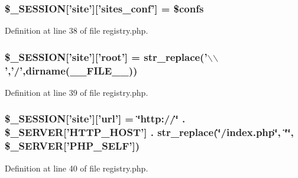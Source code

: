 \hypertarget{registry_8php_a1861ce240ebe27ceb04f3ec0575fe52f}{
\subsubsection[{\$\-\_\-\-S\-E\-S\-S\-I\-O\-N}]{\setlength{\rightskip}{0pt plus 5cm}\$\-\_\-\-S\-E\-S\-S\-I\-O\-N\mbox{[}'site'\mbox{]}\mbox{[}'sites\-\_\-conf'\mbox{]} = \$confs}}\label{registry_8php_a1861ce240ebe27ceb04f3ec0575fe52f}


\-Definition at line 38 of file registry.\-php.

\hypertarget{registry_8php_a412d5becb89bcaab6201484460b4d40b}{
\subsubsection[{\$\-\_\-\-S\-E\-S\-S\-I\-O\-N}]{\setlength{\rightskip}{0pt plus 5cm}\$\-\_\-\-S\-E\-S\-S\-I\-O\-N\mbox{[}'site'\mbox{]}\mbox{[}'root'\mbox{]} = str\-\_\-replace('$\backslash$$\backslash$','/',dirname(\-\_\-\-\_\-\-F\-I\-L\-E\-\_\-\-\_\-))}}\label{registry_8php_a412d5becb89bcaab6201484460b4d40b}


\-Definition at line 39 of file registry.\-php.

\hypertarget{registry_8php_ab2cf02dd828a414e71913943a07bb9d4}{
\subsubsection[{\$\-\_\-\-S\-E\-S\-S\-I\-O\-N}]{\setlength{\rightskip}{0pt plus 5cm}\$\-\_\-\-S\-E\-S\-S\-I\-O\-N\mbox{[}'site'\mbox{]}\mbox{[}'url'\mbox{]} = \char`\"{}http\-://\char`\"{} . \$\-\_\-\-S\-E\-R\-V\-E\-R\mbox{[}'\-H\-T\-T\-P\-\_\-\-H\-O\-S\-T'\mbox{]} . str\-\_\-replace(\char`\"{}/index.\-php\char`\"{}, \char`\"{}\char`\"{}, \$\-\_\-\-S\-E\-R\-V\-E\-R\mbox{[}'\-P\-H\-P\-\_\-\-S\-E\-L\-F'\mbox{]})}}\label{registry_8php_ab2cf02dd828a414e71913943a07bb9d4}


\-Definition at line 40 of file registry.\-php.


